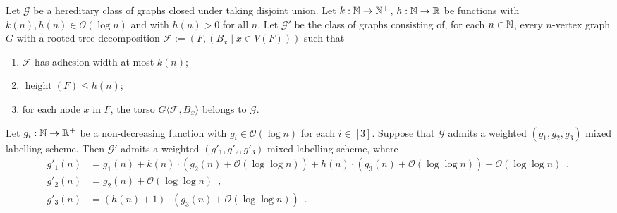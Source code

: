 \documentclass{patmorin}
\renewcommand{\le}{\leqslant}
\newcommand{\torso}[2]{{#1}\langle{#2}\rangle}
\DeclareMathOperator{\height}{height}
\newcommand{\Oh}{\calO}
\newcommand{\calF}{\mathcal{F}}
\newcommand{\calG}{\mathcal{G}}
\newcommand{\calO}{\mathcal{O}}
\begin{document}
  \begin{lem}\label{small_height}
    Let $\calG$ be a hereditary class of graphs closed under taking disjoint union. Let $k:\mathbb{N}\to\mathbb{N}^+$,  $h:\mathbb{N}\to\mathbb{R}$ be functions with $k(n),h(n)\in \Oh(\log n)$ and with $h(n)>0$ for all $n$.   Let $\calG'$ be the class of graphs consisting of, for each $n\in\mathbb{N}$, every $n$-vertex graph $G$ with a rooted tree-decomposition $\calF:=(F,(B_x \mid x\in V(F)))$ such that
    \begin{enumerate}[nosep,nolistsep,label=(\rm{\roman*)}]
      \item $\calF$ has adhesion-width at most $k(n)$;
      \item $\height(F)\le h(n)$;
      \item for each node $x$ in $F$, the torso $\torso{G}{\calF,B_x}$ belongs to $\calG$.
    \end{enumerate}
    Let $g_i:\mathbb{N}\to\mathbb{R}^+$ be a non-decreasing function  with $g_i\in\Oh(\log n)$ for each $i\in[3]$. Suppose that $\calG$ admits a weighted $(g_1,g_2,g_3)$ mixed labelling scheme. Then $\calG'$ admits a weighted $(g'_1,g'_2,g'_3)$ mixed labelling scheme, where
    \begin{align*}
       g'_1(n) & = g_1(n)
             + k(n)\cdot (g_2(n)+\Oh(\log\log n))
            + h(n)\cdot (g_3(n)+\Oh(\log\log n)) +\Oh(\log\log n)\enspace,\\
       g'_2(n) & = g_2(n) + \Oh(\log\log n)\enspace, \\
       g'_3(n) & = (h(n)+1)\cdot (g_3(n)+\Oh(\log\log n))\enspace.
    \end{align*}
  \end{lem}
\end{document}
